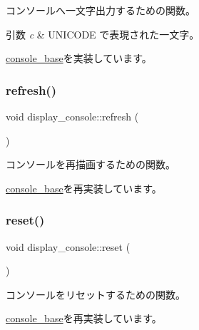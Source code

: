 コンソールへ一文字出力するための関数。 
\begin{DoxyParams}{引数}
{\em c} & U\+N\+I\+C\+O\+DE で表現された一文字。 \\
\hline
\end{DoxyParams}


\hyperlink{classconsole__base_a584c38d4ca34363f399895e30133b814}{console\+\_\+base}を実装しています。

\hypertarget{classdisplay__console_a94dcd0e51a5227c807c59c99c6a739c9}{}\label{classdisplay__console_a94dcd0e51a5227c807c59c99c6a739c9} 
\subsubsection{\texorpdfstring{refresh()}{refresh()}}
{\footnotesize\ttfamily void display\+\_\+console\+::refresh (\begin{DoxyParamCaption}{ }\end{DoxyParamCaption})\hspace{0.3cm}{\ttfamily [virtual]}}

コンソールを再描画するための関数。 

\hyperlink{classconsole__base_abd597aeba24dbc8552479b58db052980}{console\+\_\+base}を再実装しています。

\hypertarget{classdisplay__console_af24f8d041c5ffb3b19ecec5521daad4a}{}\label{classdisplay__console_af24f8d041c5ffb3b19ecec5521daad4a} 
\subsubsection{\texorpdfstring{reset()}{reset()}}
{\footnotesize\ttfamily void display\+\_\+console\+::reset (\begin{DoxyParamCaption}{ }\end{DoxyParamCaption})\hspace{0.3cm}{\ttfamily [virtual]}}

コンソールをリセットするための関数。 

\hyperlink{classconsole__base_a79693833fdcd6b83c6b9a18919355bb3}{console\+\_\+base}を再実装しています。

\hypertarget{classdisplay__console_a0f34879169e6cc12e03071575c87dd83}{}\label{classdisplay__console_a0f34879169e6cc12e03071575c87dd83} 
